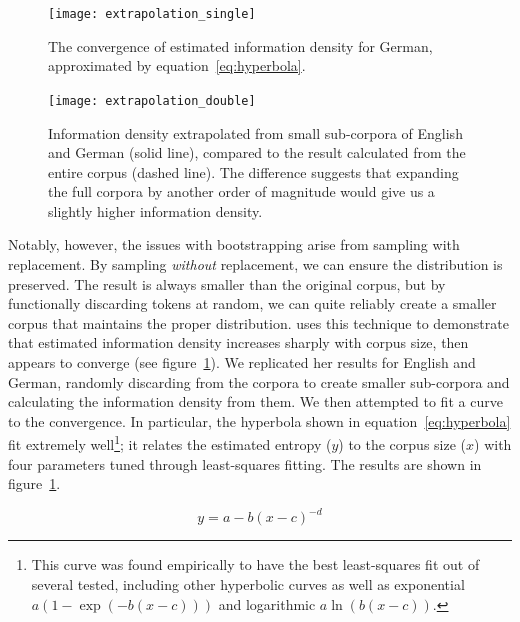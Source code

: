 \documentclass[12pt,twoside]{article}
\begin{document}
\begin{figure}[p]
\centering
\caption{The convergence of estimated information density for German, approximated by equation~\ref{eq:hyperbola}.}
\label{fig:exsingle}
\noindent\texttt{[image: extrapolation\_single]}
\end{figure}

\begin{figure}[p]
\centering
\caption{Information density extrapolated from small sub-corpora of English and German (solid line), compared to the result calculated from the entire corpus (dashed line). The difference suggests that expanding the full corpora by another order of magnitude would give us a slightly higher information density.}
\label{fig:exdouble}
\noindent\texttt{[image: extrapolation\_double]}
\end{figure}

Notably, however, the issues with bootstrapping arise from sampling with replacement. By sampling \emph{without} replacement, we can ensure the distribution is preserved. The result is always smaller than the original corpus, but by functionally discarding tokens at random, we can quite reliably create a smaller corpus that maintains the proper distribution. \citet[57]{oh} uses this technique to demonstrate that estimated information density increases sharply with corpus size, then appears to converge (see figure~\ref{fig:exsingle}). We replicated her results for English and German, randomly discarding from the corpora to create smaller sub-corpora and calculating the information density from them. We then attempted to fit a curve to the convergence. In particular, the hyperbola shown in equation~\ref{eq:hyperbola} fit extremely well\footnote{This curve was found empirically to have the best least-squares fit out of several tested, including other hyperbolic curves as well as exponential \(a(1-\exp(-b(x-c)))\) and logarithmic \(a\ln(b(x-c))\).}; it relates the estimated entropy (\(y\)) to the corpus size (\(x\)) with four parameters tuned through least-squares fitting. The results are shown in figure~\ref{fig:exsingle}.

\begin{equation}
\label{eq:hyperbola}
y = a-b(x-c)^{-d}
\end{equation}
\end{document}
